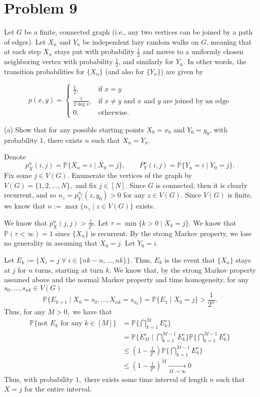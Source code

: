 \documentclass[11pt]{article}
\newcommand{\bbP}{\mathbb{P}}
\begin{document}
\section*{Problem 9}
\begin{problem}
    Let \( G \) be a finite, connected graph (i.e., any two vertices can be joined by a path of edges). Let \( X_n \) and \( Y_n \) be independent lazy random walks on \( G \), meaning that at each step \( X_n \) stays put with probability \( \frac{1}{2} \) and moves to a uniformly chosen neighboring vertex with probability \( \frac{1}{2} \), and similarly for \( Y_n \). In other words, the transition probabilities for \(\{X_n\}\) (and also for \(\{Y_n\}\)) are given by

\[
p(x, y) = \begin{cases} 
\frac{1}{2}, & \text{if } x = y \\
\frac{1}{2 \deg x}, & \text{if } x \neq y \text{ and } x \text{ and } y \text{ are joined by an edge} \\
0, & \text{otherwise}.
\end{cases}
\]



(a) Show that for any possible starting points \( X_0  = x_0\) and \( Y_0= y_0 \), with probability 1, there exists \( n \) such that \( X_n = Y_n \).
\begin{solution}
Denote \[p^n_X(i,j) =\bbP\{X_n = i \mid X_0 = j\}, \qquad P^n_Y(i,j)=\bbP\{Y_n = i \mid Y_0 = j\}.\] Fix some $j \in V(G).$ 
Enumerate the vertices of the graph by $V(G) = \{1,2,\dots, N\},$ and fix $j \in [N].$
    Since $G$ is connected, then it is clearly recurrent, and so $n_z = p_Y^{n_z}(z,y_0) >0$ for any $z\in V(G).$ Since $V(G)$ is finite, we know that $n := \max\{n_z \mid z\in V(G)\}$ exists. 
    
    We know that $p_X^n(j,j) > \frac{1}{2^n}.$ Let $\tau = \min\{k>0 \mid X_k = j\}.$ We know that $\bbP(\tau < \infty) = 1$ since $\{X_n\}$ is recurrent. By the strong Markov property, we lose no generality in assuming that $X_0 = j.$ Let $Y_0 = i.$ 

    
    
    Let $E_k := \{X_i = j\; \forall \; i \in \{nk-n, \dots, nk\} \}.$ Thus, $E_k$ is the event that $\{X_n\}$ stays at $j$ for $n$ turns, starting at turn $k.$ We know that, by the strong Markov property assumed above and the normal Markov property and time homogeneity, for any $s_0, \dots, s_{nk}\in V(G)$
    \[\bbP\{E_{k+1} \mid X_0 = s_0, \dots, X_{nk}= s_{n_k}\} = \bbP\{E_1 \mid X_0 = j\} > \frac{1}{2^n}.\] Thus, for any $M>0,$ we have that 
    \begin{align*}
        \bbP\{\text{not $E_k$ for any $k \in [M]$}\} &= \bbP\{\bigcap_{k=1}^M E_k^c\}\\
        &= \bbP\{E_M^c \mid \bigcap_{k=1}^{M-1} E_k^c \}\bbP\{\bigcap_{k=1}^{M-1} E_k^c\}\\
        &\leq (1-\frac{1}{2^n})\bbP\{\bigcap_{k=1}^{M-1} E_k^c\}\\
        &\leq (1-\frac{1}{2^n})^M\xrightarrow[M\to \infty]{} 0
    \end{align*}
    Thus, with probability $1,$ there exists some time interval of length $n$ such that $X = j$ for the entire interval.
    

\end{solution}
\end{problem}
\end{document}

